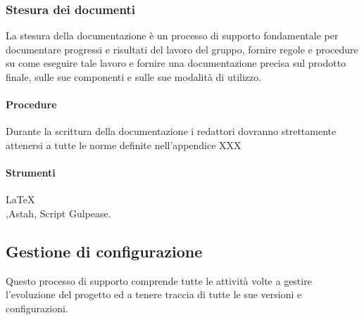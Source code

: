 \subsubsection{Stesura dei documenti}
La stesura della documentazione è un processo di supporto fondamentale per documentare progressi e risultati del lavoro del gruppo, fornire regole e procedure su come eseguire tale lavoro e fornire una documentazione precisa sul prodotto finale, sulle sue componenti e sulle sue modalità di utilizzo.
\paragraph{Procedure}

Durante la scrittura della documentazione i redattori dovranno strettamente attenersi a tutte le norme definite nell'appendice XXX %


\paragraph{Strumenti}
\LaTeX\\,Astah, Script Gulpease.




\subsection{Gestione di configurazione}
Questo processo di supporto comprende tutte le attività volte a gestire l'evoluzione del progetto ed a tenere traccia di tutte le sue versioni e configurazioni.


